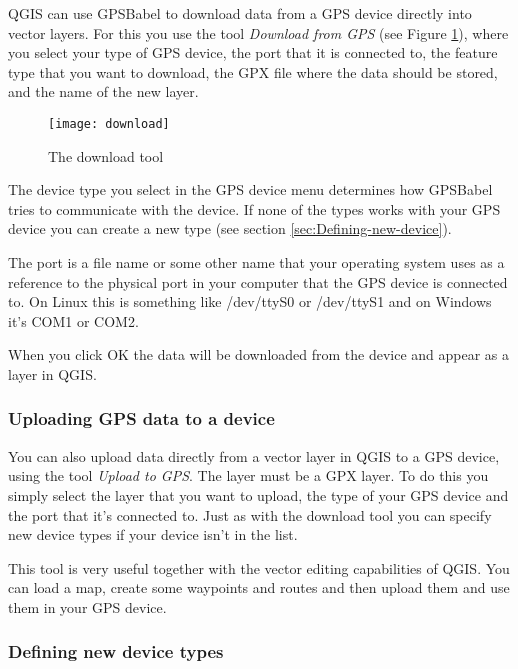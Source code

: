 QGIS can use GPSBabel to download data from a GPS device directly
into vector layers. For this you use the tool \emph{Download from
GPS} (see Figure \ref{figure_download}), where you select your type
of GPS device, the port that it is connected to, the feature type
that you want to download, the GPX file where the data should be stored,
and the name of the new layer.

\begin{figure}[ht]
   \begin{center}
\caption{\label{figure_download}The download tool}
\texttt{[image: download]}
   \end{center}
\end{figure}


The device type you select in the GPS device menu determines how GPSBabel
tries to communicate with the device. If none of the types
works with your GPS device you can create a new type (see section
\ref{sec:Defining-new-device}).

The port is a file name or some other name that your operating system
uses as a reference to the physical port in your computer that the
GPS device is connected to. On Linux this is something like /dev/ttyS0
or /dev/ttyS1 and on Windows it's COM1 or COM2.

When you click OK the data will be downloaded from the device and
appear as a layer in QGIS.

\subsubsection{Uploading GPS data to a device}

You can also upload data directly from a vector layer in QGIS to a
GPS device, using the tool \emph{Upload to GPS}. The layer must be
a GPX layer. To do this you simply select the layer that you want
to upload, the type of your GPS device and the port that it's connected
to. Just as with the download tool you can specify new device types
if your device isn't in the list.

This tool is very useful together with the vector editing capabilities
of QGIS. You can load a map, create some waypoints and routes and
then upload them and use them in your GPS device.

\subsubsection{\label{sec:Defining-new-device}Defining new device types}

